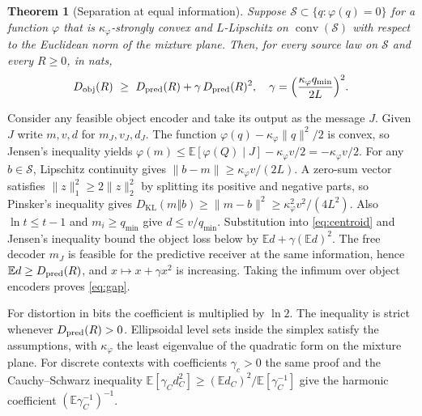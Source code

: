 \documentclass[10pt,journal]{IEEEtran}
\newtheorem{theorem}{Theorem}
\newcommand{\E}{\mathbb E}
\newcommand{\Sset}{\mathcal S}
\newcommand{\KL}{D_{\mathrm{KL}}}
\DeclareMathOperator{\conv}{conv}
\begin{document}
\begin{theorem}[Separation at equal information]\label{thm:gap}
Suppose $\Sset\subset\{q:\varphi(q)=0\}$ for a function $\varphi$ that is $\kappa_\varphi$-strongly convex and $L$-Lipschitz on $\conv(\Sset)$ with respect to the Euclidean norm of the mixture plane. Then, for every source law on $\Sset$ and every $R\ge0$, in nats,
\begin{equation}
 D_{\rm obj}(R)\ \ge\ D_{\rm pred}(R)+\gamma\,D_{\rm pred}(R)^2,\quad
 \gamma=\Big(\frac{\kappa_\varphi{q_{\min}}}{2L}\Big)^2 . \label{eq:gap}
\end{equation}
\end{theorem}
\begin{IEEEproof}
Consider any feasible object encoder and take its output as the message $J$. Given $J$ write $m,v,d$ for $m_J,v_J,d_J$. The function $\varphi(q)-\kappa_\varphi\|q\|^2/2$ is convex, so Jensen's inequality yields $\varphi(m)\le\E[\varphi(Q)\mid J]-\kappa_\varphi v/2=-\kappa_\varphi v/2$. For any $b\in\Sset$, Lipschitz continuity gives $\|b-m\|\ge\kappa_\varphi v/(2L)$. A zero-sum vector satisfies $\|z\|_1^2\ge2\|z\|_2^2$ by splitting its positive and negative parts, so Pinsker's inequality gives $\KL(m\Vert b)\ge\|m-b\|^2\ge\kappa_\varphi^2v^2/(4L^2)$. Also $\ln t\le t-1$ and $m_i\ge{q_{\min}}$ give $d\le v/{q_{\min}}$. Substitution into \eqref{eq:centroid} and Jensen's inequality bound the object loss below by $\E d+\gamma(\E d)^2$. The free decoder $m_J$ is feasible for the predictive receiver at the same information, hence $\E d\ge D_{\rm pred}(R)$, and $x\mapsto x+\gamma x^2$ is increasing. Taking the infimum over object encoders proves \eqref{eq:gap}.
\end{IEEEproof}
For distortion in bits the coefficient is multiplied by $\ln2$. The inequality is strict whenever $D_{\rm pred}(R)>0$. Ellipsoidal level sets inside the simplex satisfy the assumptions, with $\kappa_\varphi$ the least eigenvalue of the quadratic form on the mixture plane. For discrete contexts with coefficients $\gamma_c>0$ the same proof and the Cauchy--Schwarz inequality $\E[\gamma_Cd_C^2]\ge(\E d_C)^2/\E[\gamma_C^{-1}]$ give the harmonic coefficient $(\E\gamma_C^{-1})^{-1}$.
\end{document}
